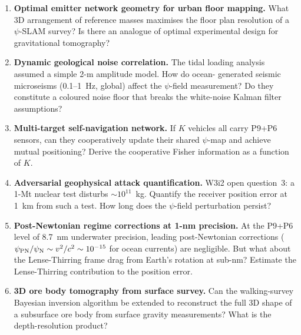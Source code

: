 \documentclass[aps,prd,twocolumn,superscriptaddress,nofootinbib]{revtex4-2}
\begin{document}
\begin{enumerate}
\item \textbf{Optimal emitter network geometry for urban floor mapping.}
  What 3D arrangement of reference masses maximises the floor plan
  resolution of a $\psi$-SLAM survey?  Is there an analogue of
  optimal experimental design for gravitational tomography?

\item \textbf{Dynamic geological noise correlation.}  The tidal loading
  analysis assumed a simple 2-m amplitude model.  How do ocean-
  generated seismic microseisms (0.1--1~Hz, global) affect the
  $\psi$-field measurement?  Do they constitute a coloured noise floor
  that breaks the white-noise Kalman filter assumptions?

\item \textbf{Multi-target self-navigation network.}  If $K$ vehicles
  all carry P9+P6 sensors, can they cooperatively update their shared
  $\psi$-map and achieve mutual positioning?  Derive the cooperative
  Fisher information as a function of $K$.

\item \textbf{Adversarial geophysical attack quantification.}
  W3i2 open question~3: a 1-Mt nuclear test disturbs $\sim 10^{11}$~kg.
  Quantify the receiver position error at 1~km from such a test.
  How long does the $\psi$-field perturbation persist?

\item \textbf{Post-Newtonian regime corrections at 1-nm precision.}
  At the P9+P6 level of 8.7~nm underwater precision, leading post-Newtonian
  corrections ($\psi_{\rm PN}/\psi_{\rm N} \sim v^2/c^2 \sim 10^{-15}$
  for ocean currents) are negligible.  But what about the Lense-Thirring
  frame drag from Earth's rotation at sub-nm?  Estimate the Lense-Thirring
  contribution to the position error.

\item \textbf{3D ore body tomography from surface survey.}
  Can the walking-survey Bayesian inversion algorithm be extended to
  reconstruct the full 3D shape of a subsurface ore body from
  surface gravity measurements?  What is the depth-resolution product?
\end{enumerate}
\end{document}
